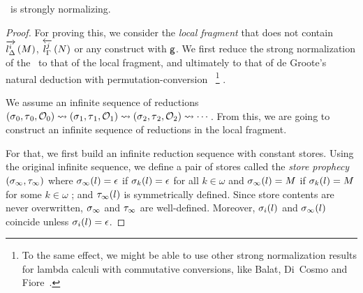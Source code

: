 \begin{theorem}
 \lgd\, is strongly normalizing.
\end{theorem}
\begin{proof}
For proving this, we consider the \textit{local fragment} that does not contain
$\ltor i l \Delta M$, $\rtol j l\Gamma N$ or any construct with $\g$.
We first reduce the strong
normalization of the \lgd\, to that of the local fragment, and 
ultimately to that of de Groote's
natural deduction with permutation-conversion~\cite{Philippe2002js}%
\footnote{
To the 
same effect, we might be able to use other strong normalization
 results for lambda calculi with commutative conversions, like Balat,
 Di~Cosmo
 and Fiore~\cite{bdf}.
}%
.

We assume an infinite sequence of reductions
$
\conf{_0}{_0}{\hypert_0}
\reduce
\conf{_1}{_1}{\hypert_1}
\reduce
\conf{_2}{_2}{\hypert_2}
\reduce\cdots 
$.  From this, we are going to construct an infinite sequence of
reductions in the local fragment.

For that, we first
build an infinite reduction sequence with constant stores. 
Using the original infinite sequence, we define a pair of stores called the
\textit{store prophecy} $(\lstore_\infty, \rstore_\infty)$ where
$ \lstore_\infty(l)= \epsilon$ if $\lstore_k(l)=\epsilon$ for all
 $k\in\omega$ and
$ \lstore_\infty(l)=M $ if $\lstore_k(l)=M$ for some $k\in\omega$
; and $\rstore_\infty(l)$ is symmetrically defined.
Since store contents are never overwritten,
$\lstore_\infty$ and $\rstore_\infty$ are well-defined.
Moreover,
$\lstore_i(l)$ and $\lstore_\infty(l)$ coincide unless
$\lstore_i(l)=\epsilon$.


\end{proof}
